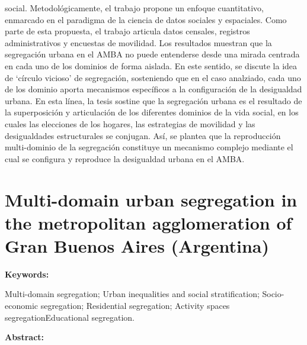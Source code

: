 \documentclass[
  spanish,
  a4paper,%
  chapterprefix=true,%
  DIV=calc,%
  twoside]{scrbook}%
\begin{document}
social. Metodológicamente, el trabajo propone un enfoque cuantitativo, enmarcado
en el paradigma de la ciencia de datos sociales y espaciales. Como parte de esta
propuesta, el trabajo articula datos censales, registros administrativos y
encuestas de movilidad. Los resultados muestran que la segregación urbana en
el AMBA no puede entenderse desde una mirada centrada en cada uno de los
dominios de forma aislada. En este sentido, se discute la idea de `círculo
vicioso' de segregación, sosteniendo que en el caso analziado, cada uno de
los dominio aporta mecanismos específicos a la configuración de la desigualdad
urbana. En esta línea, la tesis sostine que la segregación urbana es el resultado
de la superposición y articulación de los diferentes dominios de la vida social,
en los cuales las elecciones de los hogares, las estrategias de movilidad y las
desigualdades estructurales se conjugan. Así, se plantea que la reproducción
multi-dominio de la segregación constituye un mecanismo complejo mediante el
cual se configura y reproduce la desigualdad urbana en el AMBA.

\newpage

\section*{Multi-domain urban segregation in the metropolitan agglomeration of Gran Buenos Aires (Argentina)}

\textbf{Keywords:}

Multi-domain segregation;
Urban inequalities and social stratification;
Socio-economic segregation;
Residential segregation;
Activity spaces segregationEducational segregation.

\textbf{Abstract:}
\end{document}
